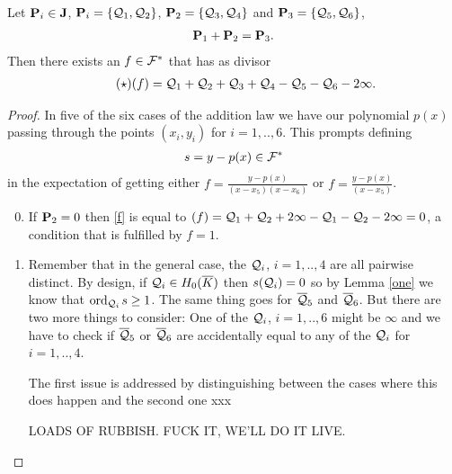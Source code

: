 \documentclass[english,11pt,a4paper]{article}
\begin{document}
\begin{theorem}
  Let $\P_i \in \J$, $\P_i = \{ \q_1, \q_2 \}$, $\P_2 = \{ \q_3, \q_4 \}$ and $\P_3 = \{ \q_5, \q_6 \}$,
  \begin{align*}
    \P_1 + \P_2 = \P_3.
  \end{align*}
  Then there exists an $f \in \F^*$ that has as divisor
  \begin{align*}\label{f}\tag{$\star$}
    (f) = \q_1 + \q_2 + \q_3 + \q_4 - \q_5 - \q_6 - 2 \infty.
  \end{align*}
  \begin{proof}
    In five of the six cases of the addition law we have our polynomial $p(x)$ passing through the points $(x_i, y_i)$ for $i = 1,..,6$. This prompts defining
    \begin{align*}
      s = y -p(x) \in \F^*
    \end{align*}
    in the expectation of getting either $f = \frac{y-p(x)}{(x-x_5)(x-x_6)}$ or $f = \frac{y-p(x)}{(x-x_5)}$.

    \begin{enumerate}[1.]\setcounter{enumi}{-1}
      \item If $\P_2 = 0$ then \eqref{f} is equal to $(f) = \q_1 + \q_2 + 2 \infty - \q_1 - \q_2 - 2 \infty = 0$, a condition that is fulfilled by $f = 1$.

      \item Remember that in the general case, the $\q_i$, $i=1,..,4$ are all pairwise distinct. By design, if $\q_i\in \enkb$ then $s(\q_i) = 0$ so by Lemma \ref{one} we know that $\ordqi s \geq 1$. The same thing goes for $\bar \q_5$ and $\bar \q_6$. But there are two more things to consider: One of the $\q_i$, $i=1,..,6$ might be $\infty$ and we have to check if $\bar \q_5$ or $\bar \q_6$ are accidentally equal to any of the $\q_i$ for $i=1,..,4$.

      The first issue is addressed by distinguishing between the cases where this does happen and the second one xxx

      LOADS OF RUBBISH. FUCK IT, WE'LL DO IT LIVE.
    \end{enumerate}
  \end{proof}
\end{theorem}




\end{document}
